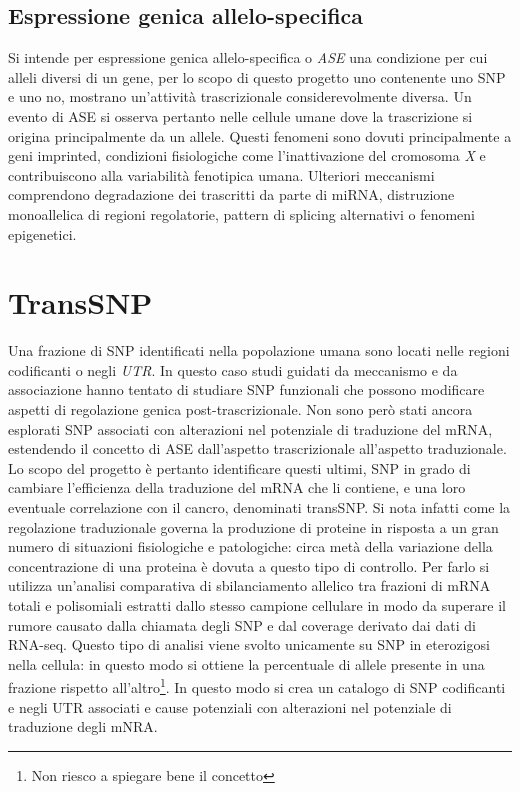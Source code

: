 \subsection{Espressione genica allelo-specifica}
Si intende per espressione genica allelo-specifica o \emph{ASE} una condizione per cui alleli diversi di un gene, per lo scopo di questo progetto uno contenente uno SNP e uno no, mostrano un'attivit\`a trascrizionale considerevolmente diversa.
Un evento di ASE si osserva pertanto nelle cellule umane dove la trascrizione si origina principalmente da un allele.
Questi fenomeni sono dovuti principalmente a geni imprinted, condizioni fisiologiche come l'inattivazione del cromosoma \emph{X} e contribuiscono alla variabilit\`a fenotipica umana.
Ulteriori meccanismi comprendono degradazione dei trascritti da parte di miRNA, distruzione monoallelica di regioni regolatorie, pattern di splicing alternativi o fenomeni epigenetici.

\section{TransSNP}
Una frazione di SNP identificati nella popolazione umana sono locati nelle regioni codificanti o negli \emph{UTR}.
In questo caso studi guidati da meccanismo e da associazione hanno tentato di studiare SNP funzionali che possono modificare aspetti di regolazione genica post-trascrizionale.
Non sono per\`o stati ancora esplorati SNP associati con alterazioni nel potenziale di traduzione del mRNA, estendendo il concetto di ASE dall'aspetto trascrizionale all'aspetto traduzionale.
Lo scopo del progetto \`e pertanto identificare questi ultimi, SNP in grado di cambiare l'efficienza della traduzione del mRNA che li contiene, e una loro eventuale correlazione con il cancro, denominati transSNP.
Si nota infatti come la regolazione traduzionale governa la produzione di proteine in risposta a un gran numero di situazioni fisiologiche e patologiche: circa met\`a della variazione della concentrazione di una proteina \`e dovuta a questo tipo di controllo.
Per farlo si utilizza un'analisi comparativa di sbilanciamento allelico tra frazioni di mRNA totali e polisomiali estratti dallo stesso campione cellulare in modo da superare il rumore causato dalla chiamata degli SNP e dal coverage derivato dai dati di RNA-seq.
Questo tipo di analisi viene svolto unicamente su SNP in eterozigosi nella cellula: in questo modo si ottiene la percentuale di allele presente in una frazione rispetto all'altro\footnote{Non riesco a spiegare bene il concetto}.
In questo modo si crea un catalogo di SNP codificanti e negli UTR associati e cause potenziali con alterazioni nel potenziale di traduzione degli mNRA.

